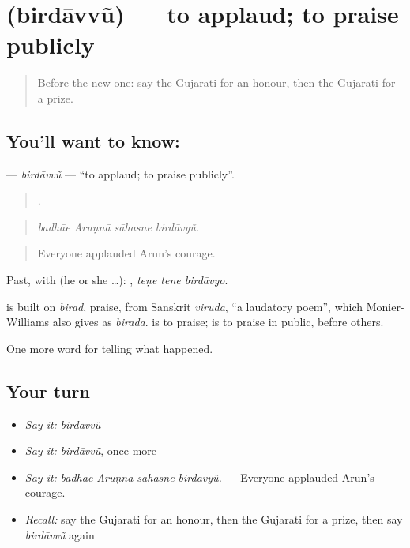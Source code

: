 \section[\texorpdfstring{\gu{બિરદાવવું} (birdāvvũ)}{બિરદાવવું (birdāvvũ)}]{ (birdāvvũ) — to applaud; to praise publicly}

\label{lesson:GU-C309-birdavvu}



\begin{quote}
Before the new one: say the Gujarati for an honour, then the Gujarati for a prize.
\end{quote}

\subsection*{You'll want to know: }
\textbf{} — \emph{birdāvvũ} — \textquotedblleft{}to applaud; to praise publicly\textquotedblright{}.

\begin{quote}
   .
\end{quote}

\begin{quote}
\emph{badhāe Aruṇnā sāhasne birdāvyũ.}
\end{quote}

\begin{quote}
Everyone applauded Arun's courage.
\end{quote}

Past, with  (he or she …):   , \emph{teṇe tene birdāvyo}.

\begin{cousinweb}
is built on \emph{birad}, praise, from Sanskrit \emph{viruda}, \textquotedblleft{}a laudatory poem\textquotedblright{}, which Monier-Williams also gives as \emph{birada}. \textbf{} is to praise; \textbf{} is to praise in public, before others.
\end{cousinweb}

\begin{grammarlens}[title={What you've built}]
One more word for telling what happened.
\end{grammarlens}

\subsection*{Your turn}
\begin{itemize}
\raggedright
  \item \emph{Say it:} \emph{birdāvvũ}
  \item \emph{Say it:} \emph{birdāvvũ}, once more
  \item \emph{Say it:} \emph{badhāe Aruṇnā sāhasne birdāvyũ.} — Everyone applauded Arun's courage.
  \item \emph{Recall:} say the Gujarati for an honour, then the Gujarati for a prize, then say \emph{birdāvvũ} again
\end{itemize}

